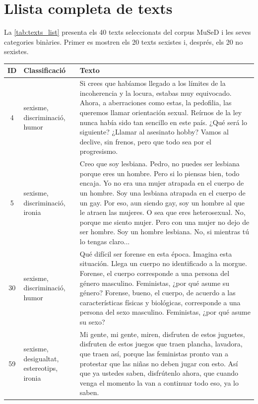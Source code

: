 \chapter{Llista completa de texts}\label{sec:appendix_texts}

La \autoref{tab:texts_list} presenta els 40 texts seleccionats del corpus MuSeD i les seves categories binàries.
Primer es mostren els 20 texts sexistes i, després, els 20 no sexistes.

\scriptsize
\iftables
\setlength{\tabcolsep}{3pt}
\begin{longtable}{c>{\raggedright}p{2.0cm}p{12.1cm}}
\toprule
\textbf{ID} & \textbf{Classificació} & \textbf{Texto} \\
\midrule
\endhead
4 & sexisme, discriminació, humor & Si crees que habíamos llegado a los límites de la incoherencia y la locura, estabas muy equivocado. Ahora, a aberraciones como estas, la pedofilia, las queremos llamar orientación sexual. Reírnos de la ley nunca había sido tan sencillo en este país. ¿Qué será lo siguiente? ¿Llamar al asesinato hobby? Vamos al declive, sin frenos, pero que todo sea por el progresismo. \\
5 & sexisme, discriminació, ironia & Creo que soy lesbiana. Pedro, no puedes ser lesbiana porque eres un hombre. Pero si lo piensas bien, todo encaja. Yo no era una mujer atrapada en el cuerpo de un hombre. Soy una lesbiana atrapada en el cuerpo de un gay. Por eso, aun siendo gay, soy un hombre al que le atraen las mujeres. O sea que eres heterosexual. No, porque me siento mujer. Pero con una mujer no dejo de ser hombre. Soy un hombre lesbiana. No, si mientras tú lo tengas claro... \\
30 & sexisme, discriminació, humor & Qué difícil ser forense en esta época. Imagina esta situación. Llega un cuerpo no identificado a la morgue. Forense, el cuerpo corresponde a una persona del género masculino. Feministas, ¿por qué asume su género? Forense, bueno, el cuerpo, de acuerdo a las características físicas y biológicas, corresponde a una persona del sexo masculino. Feministas, ¿por qué asume su sexo? \\
59 & sexisme, desigualtat, estereotips, ironia & Mi gente, mi gente, miren, disfruten de estos juguetes, disfruten de estos juegos que traen plancha, lavadora, que traen así, porque las feministas pronto van a protestar que las niñas no deben jugar con esto. Así que ya ustedes saben, disfrútenlo ahora, que cuando venga el momento la van a continuar todo eso, ya lo saben. \\

\end{longtable}
